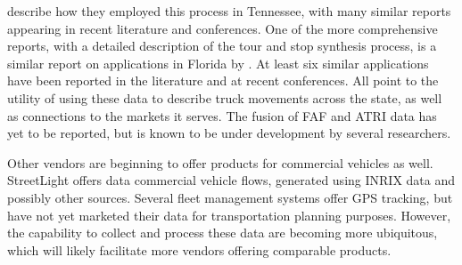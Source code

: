 \cite{bernardin14} describe how they employed this process in Tennessee, with many similar reports appearing in recent literature and conferences. One of the more comprehensive reports, with a detailed description of the tour and stop synthesis process, is a similar report on applications in Florida by \cite{pinjari14}. At least six similar applications have been reported in the literature and at recent conferences. All point to the utility of using these data to describe truck movements across the state, as well as connections to the markets it serves. The fusion of FAF and ATRI data has yet to be reported, but is known to be under development by several researchers.

Other vendors are beginning to offer products for commercial vehicles as well. StreetLight offers data commercial vehicle flows, generated using INRIX data and possibly other sources. Several fleet management systems offer GPS tracking, but have not yet marketed their data for transportation planning purposes. However, the capability to collect and process these data are becoming more ubiquitous, which will likely facilitate more vendors offering comparable products.